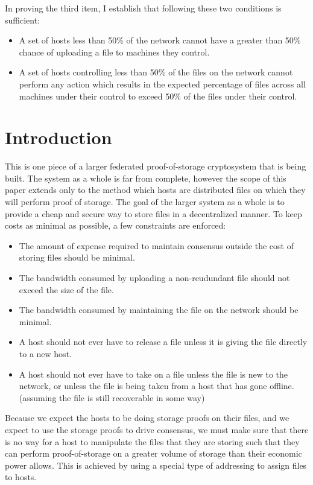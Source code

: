 \documentclass[twocolumn]{article}
\begin{document}
In proving the third item, I establish that following these two conditions is sufficient:
\begin{itemize}
	\item A set of hosts less than 50\% of the network cannot have a greater than 50\% chance of uploading a file to machines they control.
	\item A set of hosts controlling less than 50\% of the files on the network cannot perform any action which results in the expected percentage of files across all machines under their control to exceed 50\% of the files under their control.
\end{itemize}

\section{Introduction}
This is one piece of a larger federated proof-of-storage cryptosystem that is being built.
The system as a whole is far from complete, however the scope of this paper extends only to the method which hosts are distributed files on which they will perform proof of storage.
The goal of the larger system as a whole is to provide a cheap and secure way to store files in a decentralized manner.
To keep costs as minimal as possible, a few constraints are enforced:
\begin{itemize}
	\item The amount of expense required to maintain consensus outside the cost of storing files should be minimal.
	\item The bandwidth consumed by uploading a non-reudundant file should not exceed the size of the file.
	\item The bandwidth consumed by maintaining the file on the network should be minimal.
	\item A host should not ever have to release a file unless it is giving the file directly to a new host.
	\item A host should not ever have to take on a file unless the file is new to the network, or unless the file is being taken from a host that has gone offline. (assuming the file is still recoverable in some way)
\end{itemize}
Because we expect the hosts to be doing storage proofs on their files, and we expect to use the storage proofs to drive consensus, we must make sure that there is no way for a host to manipulate the files that they are storing such that they can perform proof-of-storage on a greater volume of storage than their economic power allows.
This is achieved by using a special type of addressing to assign files to hosts.
\end{document}
